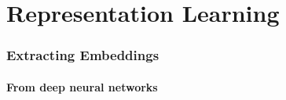 \documentclass[10pt, t, xcolor={usenames,dvipsnames,svgnames}, compress]{beamer}
\begin{document}
\section{Representation Learning}
{
  \begin{frame}[c]
    \sectionpage
  \end{frame}
}

\begin{frame}
  \frametitle{Extracting Embeddings}
  \framesubtitle{From deep neural networks}
  \begin{minipage}{0.38\linewidth}
    \begin{center}

\end{center}
\end{minipage}
\end{frame}
\end{document}
